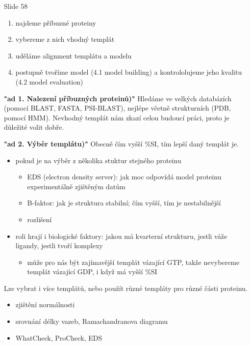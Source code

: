 \documentclass[DIV=8]{scrreprt}
\begin{document}
Slide 58
\begin{enumerate}
    \item najdeme příbuzné proteiny
    \item vybereme z nich vhodný templát
    \item uděláme alignment templátu a modelu
    \item postupně tvoříme model (4.1 model building) a kontrololujeme jeho kvalitu (4.2 model evaluation)
\end{enumerate}


\textbf{"ad 1. Nalezení příbuzných proteinů)"} Hledáme ve velkých databázích (pomocí BLAST, FASTA, PSI-BLAST), nejlépe včetně strukturních (PDB, pomocí HMM). Nevhodný templát nám zkazí celou budoucí práci, proto je důležité volit dobře.

\textbf{"ad 2. Výběr templátu)"} Obecně čím vyšší \%SI, tím lepší daný templát je.

\begin{itemize}
    \item pokud je na výběr z několika stuktur stejného proteinu
\begin{itemize}
    \item EDS (electron density server): jak moc odpovídá model proteinu experimentálně zjištěným datům
    \item B-faktor: jak je struktura stabilní; čím vyšší, tím je nestabilnější
    \item rozlišení
\end{itemize}

    \item roli hrají i biologické faktory: jakou má kvarterní strukturu, jestli váže ligandy, jestli tvoří komplexy
\begin{itemize}
    \item může pro nás být zajímavější templát vázající GTP, takže nevybereme templát vázající GDP, i když má vyšší \%SI
\end{itemize}

\end{itemize}


Lze vybrat i více templátů, nebo použít různé templáty pro různé části proteinu.

\begin{itemize}
    \item zjištění normálnosti
    \item srovnání délky vazeb, Ramachandranova diagramu
    \item WhatCheck, ProCheck, EDS
\end{itemize}
\end{document}
